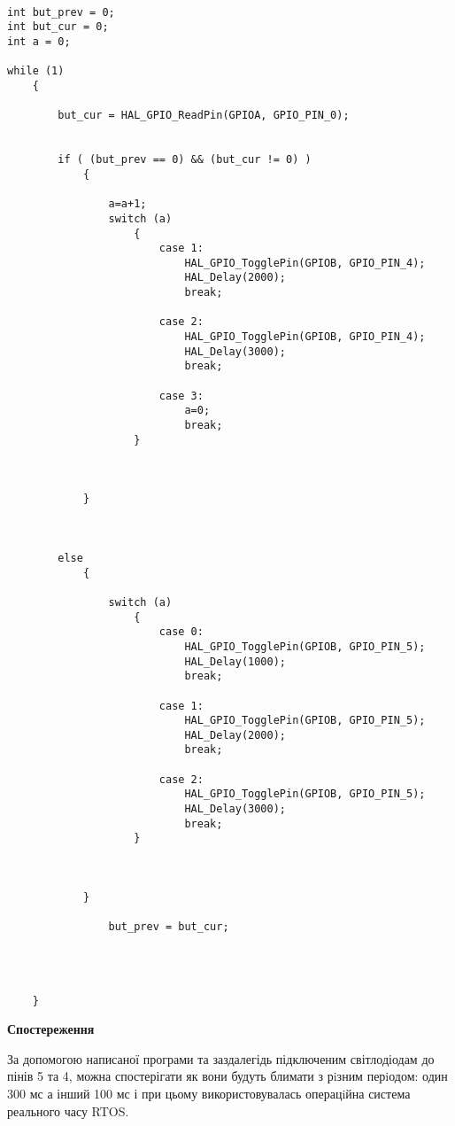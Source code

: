 \documentclass[a4paper,14pt]{extreport}
\begin{document}
\begin{verbatim}

int but_prev = 0;
int but_cur = 0;
int a = 0;

while (1)
    {
        
        but_cur = HAL_GPIO_ReadPin(GPIOA, GPIO_PIN_0);
        

        if ( (but_prev == 0) && (but_cur != 0) )
            {    

                a=a+1;
                switch (a)
                    {
                        case 1:
                            HAL_GPIO_TogglePin(GPIOB, GPIO_PIN_4);
                            HAL_Delay(2000);
                            break;

                        case 2:
                            HAL_GPIO_TogglePin(GPIOB, GPIO_PIN_4);
                            HAL_Delay(3000);
                            break;

                        case 3:
                            a=0;
                            break;
                    }



            }


     
        else
            {
                
                switch (a)
                    {
                        case 0:
                            HAL_GPIO_TogglePin(GPIOB, GPIO_PIN_5);
                            HAL_Delay(1000);
                            break;

                        case 1:
                            HAL_GPIO_TogglePin(GPIOB, GPIO_PIN_5);
                            HAL_Delay(2000);
                            break;

                        case 2:
                            HAL_GPIO_TogglePin(GPIOB, GPIO_PIN_5);
                            HAL_Delay(3000);                            
                            break;
                    }



            }

                but_prev = but_cur;
        



    }
\end{verbatim}
\begin{center}
\textbf{Спостереження}
\end{center}

За допомогою написаної програми та заздалегідь підключеним світлодіодам до пінів 5 та 4, можна спостерігати як вони  будуть блимати з рiзним перiодом: один 300 мс а інший 100 мс і при цьому використовувалась операцiйна система реального часу RTOS.
\end{document}
